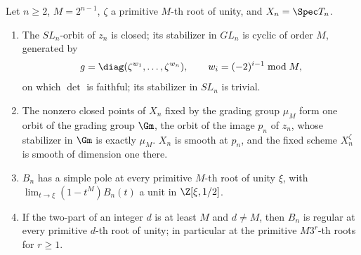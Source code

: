 \begin{theorem}\label{thm:K024}
Let $n\ge2$, $M=2^{n-1}$, $\zeta$ a primitive $M$-th root of unity, and
$X_n=\Spec T_n$.
\begin{enumerate}
\item The $SL_n$-orbit of $z_n$ is closed; its stabilizer in $GL_n$ is cyclic of
order $M$, generated by
\begin{equation}\label{eq:chainelement}
 g=\diag(\zeta^{w_1},\dots,\zeta^{w_n}),\qquad w_i=(-2)^{i-1}\bmod M ,
\end{equation}
on which $\det$ is faithful; its stabilizer in $SL_n$ is trivial.
\item The nonzero closed points of $X_n$ fixed by the grading group $\mu_M$
form one orbit of the grading group $\Gm$, the orbit of the image $p_n$ of
$z_n$, whose stabilizer in $\Gm$ is exactly $\mu_M$. $X_n$ is smooth at $p_n$,
and the fixed scheme $X_n^{\zeta}$ is smooth of dimension one there.
\item $B_n$ has a simple pole at every primitive $M$-th root of unity $\xi$,
with $\lim_{t\to\xi}(1-t^M)B_n(t)$ a unit in $\Z[\xi,1/2]$.
\item If the two-part of an integer $d$ is at least $M$ and $d\ne M$, then
$B_n$ is regular at every primitive $d$-th root of unity; in particular at the
primitive $M3^r$-th roots for $r\ge1$.
\end{enumerate}
\end{theorem}

